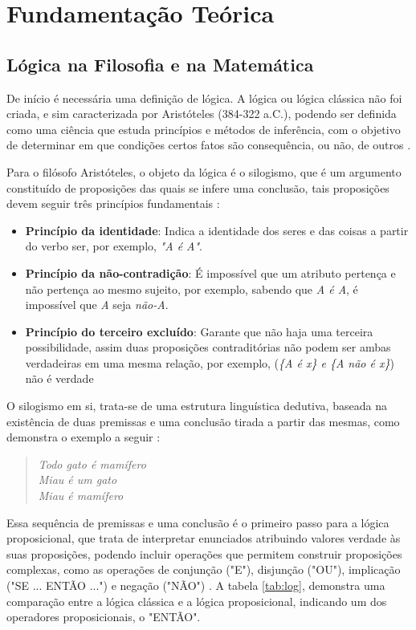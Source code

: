 \chapter{Fundamentação Teórica}

\section{Lógica na Filosofia e na Matemática}

De início é necessária uma definição de lógica. A lógica ou lógica clássica não foi criada, e sim caracterizada por Aristóteles (384-322 a.C.), podendo ser definida como uma ciência que estuda princípios e métodos de inferência, com o objetivo de determinar em que condições certos fatos são consequência, ou não, de outros \cite{mortari2001}.

Para o filósofo Aristóteles, o objeto da lógica é o silogismo, que é um argumento constituído de proposições das quais se infere uma conclusão, tais proposições devem seguir três princípios fundamentais \cite{zamudio2008tres}: 

\begin{itemize}
    \item \textbf{Princípio da identidade}: Indica a identidade dos seres e das coisas a partir do verbo ser, por exemplo, \textit{"A é A"}.
    \item \textbf{Princípio da não-contradição}: É impossível que um atributo pertença e não pertença ao mesmo sujeito, por exemplo, sabendo que \textit{A é A}, é impossível que \textit{A} seja \textit{não-A}.
    \item \textbf{Princípio do terceiro excluído}: Garante que não haja uma terceira possibilidade, assim duas proposições contraditórias não podem ser ambas verdadeiras em uma mesma relação, por exemplo, (\textit{\{A é x\} e \{A não é x\}}) não é verdade
\end{itemize}

O silogismo em si, trata-se de uma estrutura linguística dedutiva, baseada na existência de duas premissas e uma conclusão tirada a partir das mesmas, como demonstra o exemplo a seguir \cite{mortari2001}:

\begin{quote}\centering
    \textit{Todo gato é mamífero \\
    Miau é um gato \\
    Miau é mamífero}
\end{quote}

Essa sequência de premissas e uma conclusão é o primeiro passo para a lógica proposicional, que trata de interpretar enunciados atribuindo valores verdade às suas proposições, podendo incluir operações que permitem construir proposições complexas, como as operações de conjunção ("E"), disjunção ("OU"), implicação ("SE ... ENTÃO ...") e negação ("NÃO") \cite{flavio2010}. A tabela \ref{tab:log}, demonstra uma comparação entre a lógica clássica e a lógica proposicional, indicando um dos operadores proposicionais, o "ENTÃO".

